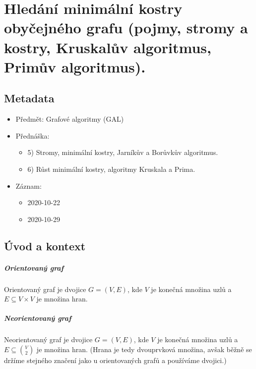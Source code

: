 

\chapter{Hledání minimální kostry obyčejného grafu (pojmy, stromy a kostry, Kruskalův algoritmus, Primův algoritmus).}


\section{Metadata}

\begin{itemize}
    \item Předmět: Grafové algoritmy (GAL)
    \item Přednáška:
    \begin{itemize}
        \item 5) Stromy, minimální kostry, Jarníkův a Borůvkův algoritmus.
        \item 6) Růst minimální kostry, algoritmy Kruskala a Prima.
    \end{itemize}
    \item Záznam:
    \begin{itemize}
        \item 2020-10-22
        \item 2020-10-29
    \end{itemize}
\end{itemize}


\section{Úvod a kontext}

\paragraph*{Orientovaný graf} Orientovaný graf je dvojice $G = (V, E)$, kde $V$ je konečná množina uzlů a $E \subseteq V \times V$ je množina hran.

\paragraph*{Neorientovaný graf} Neorientovaný graf je dvojice $G = (V, E)$, kde $V$ je konečná množina uzlů a $E \subseteq \binom{V}{2}$ je množina hran. (Hrana je tedy dvouprvková množina, avšak běžně se držíme stejného značení jako u orientovaných grafů a používáme dvojici.)

